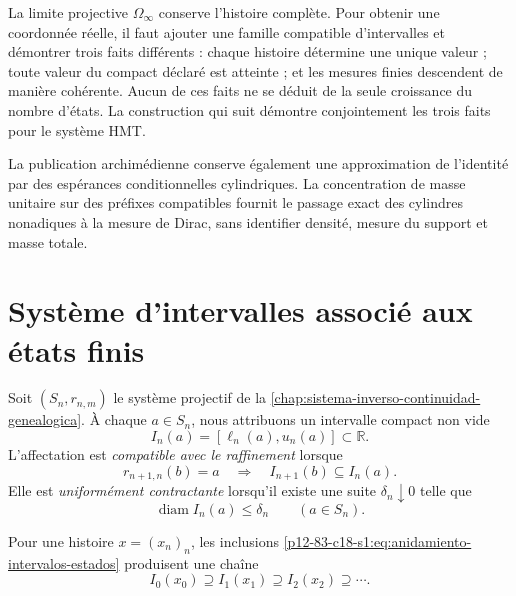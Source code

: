 \label{chap:83-18}

La limite projective \(\Omega_\infty\) conserve l'histoire complète. Pour
obtenir une coordonnée réelle, il faut ajouter une famille compatible
d'intervalles et démontrer trois faits différents : chaque histoire détermine une
unique valeur ; toute valeur du compact déclaré est atteinte ; et les mesures
finies descendent de manière cohérente. Aucun de ces faits ne se déduit
de la seule croissance du nombre d'états. La construction qui suit
démontre conjointement les trois faits pour le système HMT.

La publication archimédienne conserve également une approximation de
l'identité par des espérances conditionnelles cylindriques. La concentration de masse
unitaire sur des préfixes compatibles fournit le passage exact des
cylindres nonadiques à la mesure de Dirac, sans identifier densité,
mesure du support et masse totale.

\begin{HMTScientificOwnerSubordinated}

\end{HMTScientificOwnerSubordinated}

\section{Système d'intervalles associé aux états finis}

Soit \((S_n,r_{n,m})\) le système projectif de la
\cref{chap:sistema-inverso-continuidad-genealogica}. À chaque
\(a\in S_n\), nous attribuons un intervalle compact non vide
\begin{equation}
 I_n(a)=[\ell_n(a),u_n(a)]\subset\mathbb R.
 \label{p12-83-c18-s1:eq:intervalo-asociado-estado}
\end{equation}
L'affectation est \emph{compatible avec le raffinement} lorsque
\begin{equation}
 r_{n+1,n}(b)=a
 \quad\Longrightarrow\quad
 I_{n+1}(b)\subseteq I_n(a).
 \label{p12-83-c18-s1:eq:anidamiento-intervalos-estados}
\end{equation}
Elle est \emph{uniformément contractante} lorsqu'il existe une suite
\(\delta_n\downarrow0\) telle que
\begin{equation}
 \operatorname{diam}I_n(a)\leq\delta_n
 \qquad(a\in S_n).
 \label{p12-83-c18-s1:eq:contraccion-uniforme-intervalos}
\end{equation}

Pour une histoire \(x=(x_n)_n\), les inclusions
\eqref{p12-83-c18-s1:eq:anidamiento-intervalos-estados} produisent une chaîne
\begin{equation}
 I_0(x_0)\supseteq I_1(x_1)\supseteq I_2(x_2)\supseteq\cdots.
 \label{p12-83-c18-s1:eq:cadena-intervalos-historia}
\end{equation}

